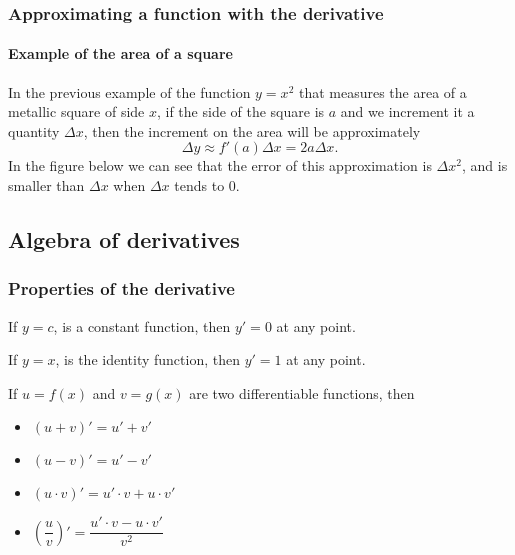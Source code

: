 \begin{frame}
\frametitle{Approximating a function with the derivative}
\framesubtitle{Example of the area of a square}
In the previous example of the function $y=x^2$ that measures the area of a metallic square of side $x$, if the side of the square is $a$ and we increment it a quantity $\Delta x$, then the increment on the area will be approximately
\[
\Delta y \approx f'(a)\Delta x = 2a\Delta x.
\]
In the figure below we can see that the error of this approximation is $\Delta x^2$, and is smaller than $\Delta x$ when $\Delta x$ tends to 0. 
\begin{center}
\end{center}

\end{frame}


\subsection{Algebra of derivatives}
\begin{frame}
\frametitle{Properties of the derivative}
If $y=c$, is a constant function, then $y'=0$ at any point.

If $y=x$, is the identity function, then  $y'=1$ at any point.

If $u=f(x)$ and $v=g(x)$ are two differentiable functions, then 
\begin{itemize}
\item $(u+v)'=u'+v'$
\item $(u-v)'=u'-v'$
\item $(u\cdot v)'=u'\cdot v+ u\cdot v'$
\item $\left(\dfrac{u}{v}\right)'=\dfrac{u'\cdot v-u\cdot v'}{v^2}$
\end{itemize}
\end{frame}


